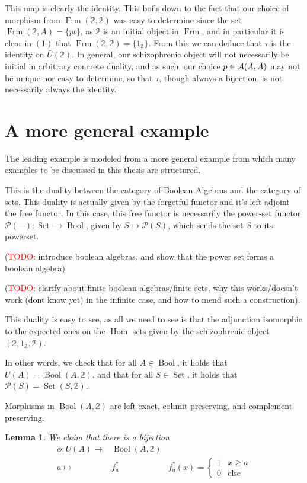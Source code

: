 \documentclass[12pt,a4paper]{article}
\newtheorem{lemma}{Lemma}[section] %
\DeclareMathOperator{\Hom}{Hom}
\DeclareMathOperator{\Set}{Set}
\DeclareMathOperator{\Frm}{Frm}
\DeclareMathOperator{\Bool}{Bool}
\def\HomA{\ensuremath\mathcal{A}}
\def\t{\ensuremath\tilde}
\begin{document}
This map is clearly the identity. This boils down to the fact that our choice of morphism from $\Frm(\mathbb{2},\mathbb{2})$ was easy to determine since the set $\Frm(\mathbb{2},A) = \{pt\}$, as $\mathbb{2}$ is an initial object in $\Frm$, and in particular it is clear in $(1)$ that $\Frm(\mathbb{2},\mathbb{2}) = \{1_{\mathbb{2}}\}$. From this we can deduce that $\tau$ is the identity on $\bar U(\mathbb{2})$.
In general, our schizophrenic object will not necessarily be initial in arbitrary concrete duality, and as such, our choice $p \in \HomA(\t A, \t A)$ may not be unique nor easy to determine, so that $\tau$, though always a bijection, is not necessarily always the identity. 

\section{A more general example}

The leading example is modeled from a more general example from which many examples to be discussed in this thesis are structured. 

This is the duality between the category of Boolean Algebras and the category of sets. This duality is actually given by the forgetful functor and it's left adjoint the free functor. In this case, this free functor is necessarily the power-set functor $\mathcal{P}(-): \Set \to \Bool$, given by $S \mapsto \mathcal{P}(S)$, which sends the set $S$ to its powerset.  

(\textcolor{red}{TODO}: introduce boolean algebras, and show that the power set forms a boolean algebra) 

(\textcolor{red}{TODO}: clarify about finite boolean algebras/finite sets, why this works/doesn't work (dont know yet) in the infinite case, and how to mend such a construction). 

This duality is easy to see, as all we need to see is that the adjunction isomorphic to the expected ones on the $\Hom$ sets given by the schizophrenic object $(\mathbb{2}, 1_{\mathbb{2}}, \mathbb{2})$. 

In other words, we check that for all $A \in \Bool$, it holds that $U(A) = \Bool(A, \mathbb{2})$, and that for all $S \in \Set$, it holds that $\mathcal{P}(S) = \Set(S, \mathbb{2})$. 

 Morphisms in $\Bool(A, \mathbb{2})$ are left exact, colimit preserving, and complement preserving.
 
\begin{lemma}
	We claim that there is a bijection \begin{align*}
  	\phi: U(A) \to& \Bool(A, \mathbb{2})\\
  	a \mapsto& f^*_a &f^*_a(x) = \begin{cases}
   1 & x \geq a \\
    0 & \text{else}
  \end{cases}
  \end{align*}
\end{lemma}
\end{document}
